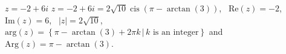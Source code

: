 { $z = -2+6i$}
{ $z = -2 + 6i = 2\sqrt{10}\operatorname{cis}\left(\pi - \arctan\left(3\right)\right)$, \, $\text{Re}(z) = -2$, \, $\text{Im}(z) = 6$, \, $|z| =2\sqrt{10}$, \, $\text{arg}(z) = \left\{\pi - \arctan\left(3\right) + 2\pi k \, | \, \text{$k$ is an integer} \right\}$ and $\text{Arg}(z) =\pi - \arctan\left(3\right) $.}
